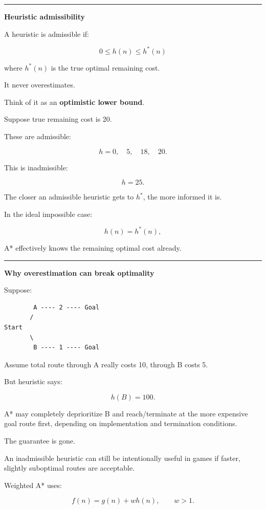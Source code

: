 \begin{center}\rule{0.5\linewidth}{0.5pt}\end{center}

\textbf{Heuristic admissibility}

A heuristic is admissible if:

\[
\boxed{
0\le h(n)\le h^*(n)
}
\]

where \(h^*(n)\) is the true optimal remaining cost.

It never overestimates.

Think of it as an \textbf{optimistic lower bound}.

Suppose true remaining cost is 20.

These are admissible:

\[
h=0,\quad5,\quad18,\quad20.
\]

This is inadmissible:

\[
h=25.
\]

The closer an admissible heuristic gets to \(h^*\), the more informed it is.

In the ideal impossible case:

\[
h(n)=h^*(n),
\]

A* effectively knows the remaining optimal cost already.

\begin{center}\rule{0.5\linewidth}{0.5pt}\end{center}

\textbf{Why overestimation can break optimality}

Suppose:

\begin{verbatim}
        A ---- 2 ---- Goal
       /
Start
       \
        B ---- 1 ---- Goal
\end{verbatim}

Assume total route through A really costs 10, through B costs 5.

But heuristic says:

\[
h(B)=100.
\]

A* may completely deprioritize B and reach/terminate at the more expensive goal route first, depending on implementation and termination conditions.

The guarantee is gone.

An inadmissible heuristic can still be intentionally useful in games if faster, slightly suboptimal routes are acceptable.

Weighted A* uses:

\[
f(n)=g(n)+w h(n),
\qquad
w>1.
\]

